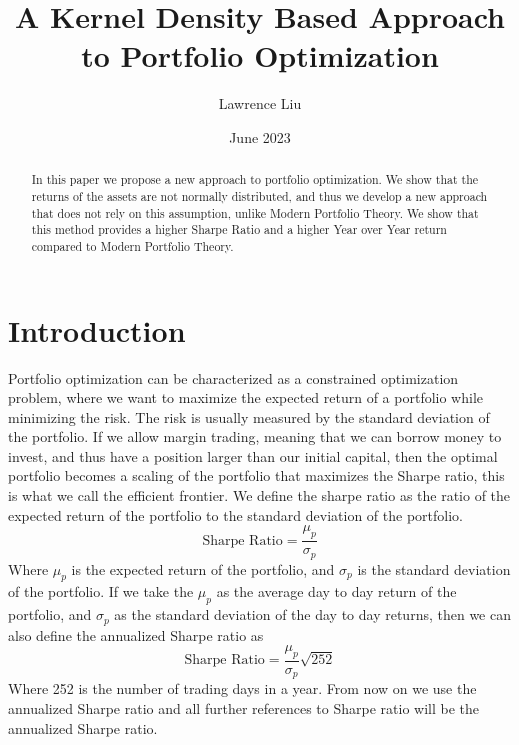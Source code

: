 \documentclass[10pt]{article}
\title{A Kernel Density Based Approach to Portfolio Optimization}
\author{Lawrence Liu}
\date{June 2023}
\begin{document}
\maketitle
\begin{abstract}
    In this paper we propose a new approach to portfolio optimization. 
    We show that the returns of the assets are not normally distributed, and thus we develop a new approach 
    that does not rely on this assumption, unlike Modern Portfolio Theory. We show that this method 
    provides a higher Sharpe Ratio and a higher Year over Year return compared to Modern Portfolio Theory.
\end{abstract}
\section{Introduction}
Portfolio optimization can be characterized as a constrained optimization problem, where we want to maximize the expected return 
of a portfolio while minimizing the risk. The risk is usually measured by the standard deviation of the portfolio. If we allow margin trading,
meaning that we can borrow money to invest, and thus have a position larger than our initial capital, then the optimal 
portfolio becomes a scaling of the portfolio that maximizes the Sharpe ratio, this is what we call the efficient frontier. We define the 
sharpe ratio as the ratio of the expected return of the portfolio to the standard deviation of the portfolio.
\begin{equation}
    \text{Sharpe Ratio} = \frac{\mu_p}{\sigma_p}
\end{equation}
Where $\mu_p$ is the expected return of the portfolio, and $\sigma_p$ is the standard deviation of the portfolio. If we take the $\mu_p$
as the average day to day return of the portfolio, and $\sigma_p$ as the standard deviation of the day to day returns, then we can 
also define the annualized Sharpe ratio as
\begin{equation}
    \text{Sharpe Ratio} = \frac{\mu_p}{\sigma_p}\sqrt{252}
\end{equation}
Where 252 is the number of trading days in a year. From now on we use the annualized Sharpe ratio and all further references 
to Sharpe ratio will be the annualized Sharpe ratio.
\end{document}
